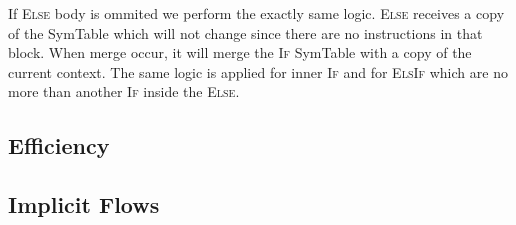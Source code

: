 If \textsc{Else} body is ommited we perform the exactly same logic. \textsc{Else} receives a copy of the SymTable
which will not change since there are no instructions in that block. When merge occur, it will merge the \textsc{If}
SymTable with a copy of the current context.
The same logic is applied for inner \textsc{If} and for \textsc{ElsIf} which are no more than another \textsc{If}
inside the \textsc{Else}.

\subsection*{Efficiency}

\subsection*{Implicit Flows}
